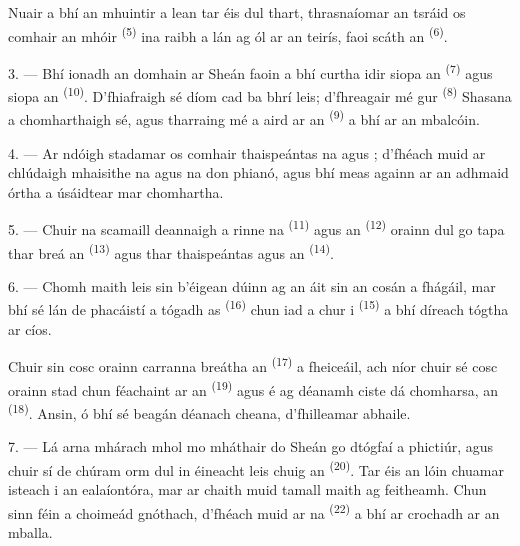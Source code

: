 Nuair a bhí an mhuintir a lean tar éis dul thart, thrasnaíomar an tsráid os comhair an
 mhóir \textsuperscript{(5)} ina raibh a lán 
ag ól  ar an teirís, faoi scáth an 
\textsuperscript{(6)}.

3. --- Bhí ionadh an domhain ar Sheán faoin  a bhí curtha idir siopa an
 \textsuperscript{(7)} agus siopa an  \textsuperscript{(10)}. D'fhiafraigh sé díom cad ba bhrí leis; d'fhreagair mé
gur  \textsuperscript{(8)} Shasana a chomharthaigh sé, agus
tharraing mé a aird ar an  \textsuperscript{(9)} a bhí ar an mbalcóin.

\VUsaut{3.0mm}

4. --- Ar ndóigh stadamar os comhair thaispeántas na 
  agus ; d'fhéach
muid ar chlúdaigh mhaisithe na  agus na  don
phianó, agus bhí meas againn ar an  adhmaid órtha a úsáidtear mar
chomhartha.

5. --- Chuir na scamaill deannaigh a rinne na  \textsuperscript{(11)}
agus an  \textsuperscript{(12)} orainn dul go tapa thar
 breá an  \textsuperscript{(13)} agus thar
thaispeántas  agus  an 
\textsuperscript{(14)}.

6. --- Chomh maith leis sin b'éigean dúinn ag an áit sin an cosán a fhágáil, mar bhí
sé lán de phacáistí a tógadh as  \textsuperscript{(16)} chun iad
a chur i  \textsuperscript{(15)} a bhí díreach tógtha ar cíos.

Chuir sin cosc orainn carranna breátha an 
\textsuperscript{(17)} a fheiceáil, ach níor chuir sé cosc orainn stad chun féachaint
ar an  \textsuperscript{(19)} agus é ag déanamh ciste dá chomharsa,
an  \textsuperscript{(18)}. Ansin, ó bhí sé
beagán déanach cheana, d'fhilleamar abhaile.

\VUsaut{3.0mm}

7. --- Lá arna mhárach mhol mo mháthair do Sheán go dtógfaí a phictiúr, agus chuir sí
de chúram orm dul in éineacht leis chuig an 
\textsuperscript{(20)}. Tar éis an lóin chuamar isteach i  an
ealaíontóra, mar ar chaith muid tamall maith ag feitheamh. Chun sinn féin a
choimeád gnóthach, d'fhéach muid ar na  \textsuperscript{(22)} a bhí
ar crochadh ar an mballa.


